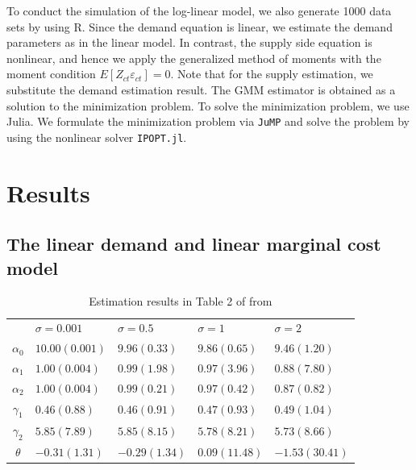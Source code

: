 \documentclass[11pt, a4paper]{article}
\begin{document}
To conduct the simulation of the log-linear model, we also generate 1000 data sets by using R. 
Since the demand equation is linear, we estimate the demand parameters as in the linear model.
In contrast, the supply side equation is nonlinear, and hence we apply the generalized method of moments with the moment condition $E[Z_{ct} \varepsilon_{ct}] = 0$.
Note that for the supply estimation, we substitute the demand estimation result.
The GMM estimator is obtained as a solution to the minimization problem.
To solve the minimization problem, we use Julia.
We formulate the minimization problem via \texttt{JuMP} and solve the problem by using the nonlinear solver \texttt{IPOPT.jl}.



\section{Results}

\subsection{The linear demand and linear marginal cost model}

\begin{table}[!htbp]
    \centering
    \caption{Estimation results in Table 2 of from \cite{perloff2012collinearity}}
    \label{tb:linear_linear_sigma_Perloff_Shen} 
        \begin{tabular}{cllll}
            \hline\hline
            & $\sigma=0.001$ & $\sigma=0.5$ & $\sigma=1$ & $\sigma=2$ \\
            $\alpha_0$ & $10.00(0.001)$ & $9.96(0.33)$ & $9.86(0.65)$ & $9.46(1.20)$ \\
            $\alpha_1$ & $1.00(0.004)$ & $0.99(1.98)$ & $0.97(3.96)$ & $0.88(7.80)$ \\
            $\alpha_2$ & $1.00(0.004)$ & $0.99(0.21)$ & $0.97(0.42)$ & $0.87(0.82)$ \\
            $\gamma_1$ & $0.46(0.88)$ & $0.46(0.91)$ & $0.47(0.93)$ & $0.49(1.04)$ \\
            $\gamma_2$ & $5.85(7.89)$ & $5.85(8.15)$ & $5.78(8.21)$ & $5.73(8.66)$ \\
            $\theta$ & $-0.31(1.31)$ & $-0.29(1.34)$ & $0.09(11.48)$ & $-1.53(30.41)$ \\
            \hline
        \end{tabular}
\end{table}
\end{document}
